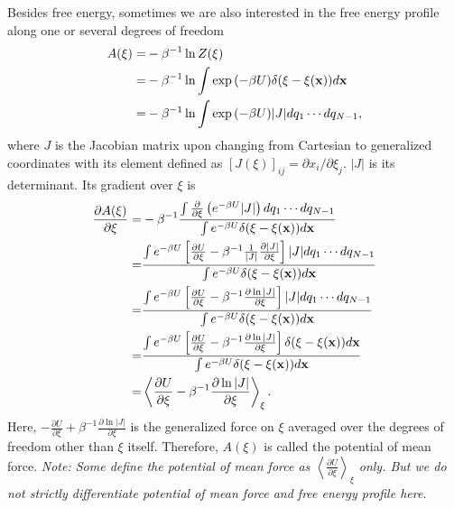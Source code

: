 Besides free energy, sometimes we are also interested in the free energy profile along one or several degrees of freedom
\begin{align}
	A(\xi)=&-\beta^{-1}\ln{Z(\xi)}\notag\\
	      =&-\beta^{-1}\ln\int \exp{\left(-\beta U\right)}\delta(\xi-\xi(\mathbf{x}))d\mathbf{x}\notag\\
	      =&-\beta^{-1}\ln\int \exp{\left(-\beta U\right)}|J|dq_1\cdots dq_{N-1},
\end{align}
where $J$ is the Jacobian matrix upon changing from Cartesian to generalized coordinates with its element defined as $\left[J(\xi)\right]_{ij}=\partial x_i/\partial \xi_j$. $|J|$ is its determinant. Its gradient over $\xi$ is
\begin{align}
\frac{\partial A(\xi)}{\partial \xi}=&-\beta^{-1}\frac{\int \frac{\partial}{\partial \xi}\left(e^{-\beta U}|J|\right)dq_1\cdots dq_{N-1}}{\int e^{-\beta U}\delta(\xi-\xi(\mathbf{x}))d\mathbf{x}}\notag\\
                                    =&\frac{\int e^{-\beta U}\left[\frac{\partial U}{\partial \xi}-\beta^{-1}\frac{1}{|J|}\frac{\partial |J|}{\partial \xi}\right]|J|dq_1\cdots dq_{N-1}}{\int e^{-\beta U}\delta(\xi-\xi(\mathbf{x}))d\mathbf{x}}\notag\\
                                    =&\frac{\int e^{-\beta U}\left[\frac{\partial U}{\partial \xi}-\beta^{-1}\frac{\partial \ln|J|}{\partial \xi}\right]|J|dq_1\cdots dq_{N-1}}{\int e^{-\beta U}\delta(\xi-\xi(\mathbf{x}))d\mathbf{x}}\notag\\
                                    =&\frac{\int e^{-\beta U}\left[\frac{\partial U}{\partial \xi}-\beta^{-1}\frac{\partial \ln|J|}{\partial \xi}\right]\delta(\xi-\xi(\mathbf{x}))d\mathbf{x}}{\int e^{-\beta U}\delta(\xi-\xi(\mathbf{x}))d\mathbf{x}}\notag\\
                                    =&\left<\frac{\partial U}{\partial \xi}-\beta^{-1}\frac{\partial \ln |J|}{\partial \xi}\right>_\xi.
\end{align}
Here, $-\frac{\partial U}{\partial \xi}+\beta^{-1}\frac{\partial \ln |J|}{\partial \xi}$ is the generalized force on $\xi$ averaged over the degrees of freedom other than $\xi$ itself. Therefore, $A(\xi)$ is called the potential of mean force. \textit{Note: Some define the potential of mean force as $\left<\frac{\partial U}{\partial \xi}\right>_\xi$ only. But we do not strictly differentiate potential of mean force and free energy profile here.}

